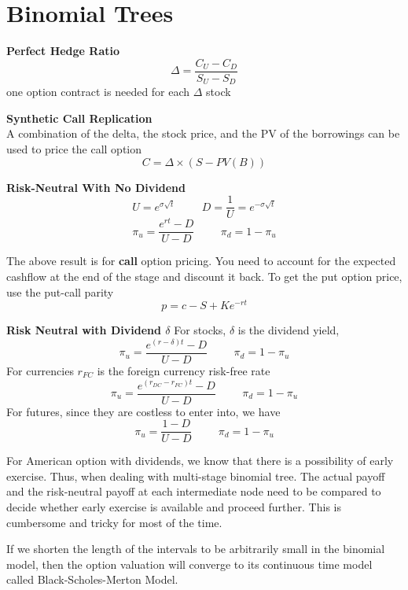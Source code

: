 \documentclass[11pt,fleqn]{report} %
\numberwithin{equation}{section} %
\numberwithin{figure}{section} %
\numberwithin{table}{section} %
\begin{document}
\chapter{Binomial Trees}
\begin{theorem}\textbf{Perfect Hedge Ratio}
$$
\Delta=\frac{C_U-C_D}{S_U-S_D}
$$
one option contract is needed for each $\Delta$ stock
\end{theorem}
 \begin{theorem}\textbf{Synthetic Call Replication}\\
 A combination of the delta, the stock price, and the PV of the borrowings can be used to price the call option
 $$
 C=\Delta\times(S-PV(B))
 $$
 \end{theorem}
 \begin{theorem}\textbf{Risk-Neutral With No Dividend}
 $$
 U=e^{\sigma\sqrt{t}}\hspace{1cm}D=\frac{1}{U}=e^{-\sigma\sqrt{t}}
 $$
 $$
 \pi_u=\frac{e^{rt}-D}{U-D}\hspace{1cm}\pi_d=1-\pi_u
 $$
 \end{theorem}
 \begin{remark}The above result is for \textbf{call} option pricing. You need to account for the expected cashflow at the end of the stage and discount it back. To get the put option price, use the put-call parity 
 $$
 p=c-S+Ke^{-rt}
 $$
 \end{remark}
 \begin{theorem}\textbf{Risk Neutral with Dividend $\delta$}
 For stocks, $\delta$ is the dividend yield, 
 $$
  \pi_u=\frac{e^{(r-\delta)t}-D}{U-D}\hspace{1cm}\pi_d=1-\pi_u
 $$
 For currencies $r_{FC}$ is the foreign currency risk-free rate
 $$
  \pi_u=\frac{e^{(r_{DC}-r_{FC})t}-D}{U-D}\hspace{1cm}\pi_d=1-\pi_u
 $$
 For futures, since they are costless to enter into, we have
 $$
  \pi_u=\frac{1-D}{U-D}\hspace{1cm}\pi_d=1-\pi_u
 $$
 \end{theorem}
 \begin{remark} For American option with dividends, we know that there is a possibility of early exercise. Thus, when dealing with multi-stage binomial tree. The actual payoff and the risk-neutral payoff at each intermediate node need to be compared to decide whether early exercise is available and proceed further. This is cumbersome and tricky for most of the time.
 \end{remark}
 \begin{theorem}
 If we shorten the length of the intervals to be arbitrarily small in the binomial model, then the option valuation will converge to its continuous time model called Black-Scholes-Merton Model.
 \end{theorem}
\end{document}
